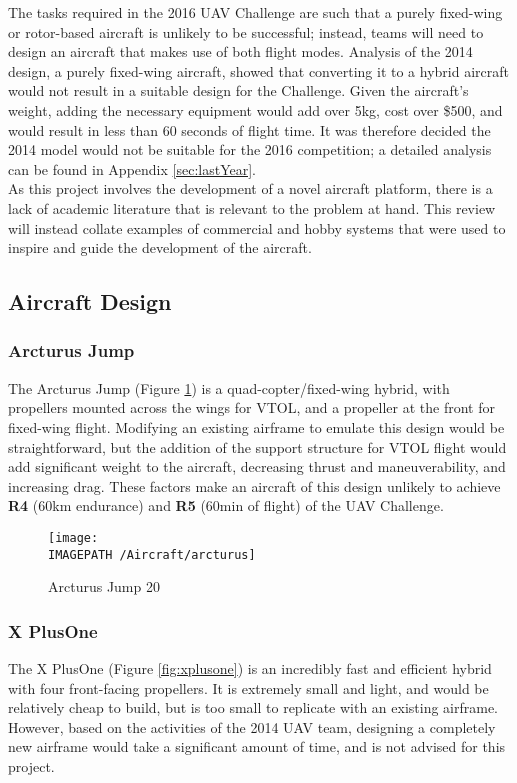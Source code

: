 The tasks required in the 2016 UAV Challenge are such that a purely fixed-wing or rotor-based aircraft is unlikely to be successful; instead, teams will need to design an aircraft that makes use of both flight modes. Analysis of the 2014 design, a purely fixed-wing aircraft, showed that converting it to a hybrid aircraft would not result in a suitable design for the Challenge. Given the aircraft's weight, adding the necessary equipment would add over 5kg, cost over \$500, and would result in less than 60 seconds of flight time. It was therefore decided the 2014 model would not be suitable for the 2016 competition; a detailed analysis can be found in Appendix \ref{sec:lastYear}.\\

As this project involves the development of a novel aircraft platform, there is a lack of academic literature that is relevant to the problem at hand. This review will instead collate examples of commercial and hobby systems that were used to inspire and guide the development of the aircraft.\\

\subsection{Aircraft Design}
\subsubsection*{Arcturus Jump}
The Arcturus Jump\cite{ref:arcturus} (Figure \ref{fig:arcturus}) is a quad-copter/fixed-wing hybrid, with propellers mounted across the wings for VTOL, and a propeller at the front for fixed-wing flight. Modifying an existing airframe to emulate this design would be straightforward, but the addition of the support structure for VTOL flight would add significant weight to the aircraft, decreasing thrust and maneuverability, and increasing drag. These factors make an aircraft of this design unlikely to achieve \textbf{R4} (60km endurance) and \textbf{R5} (60min of flight) of the UAV Challenge.

\begin{figure}[!h]
	\centering
	\texttt{[image: \\IMAGEPATH /Aircraft/arcturus]}
	\caption{Arcturus Jump 20}
	\label{fig:arcturus}
\end{figure}

\subsubsection*{X PlusOne}
The X PlusOne\cite{ref:xplusone} (Figure \ref{fig:xplusone}) is an incredibly fast and efficient hybrid with four front-facing propellers. It is extremely small and light, and would be relatively cheap to build, but is too small to replicate with an existing airframe. However, based on the activities of the 2014 UAV team, designing a completely new airframe would take a significant amount of time, and is not advised for this project.

